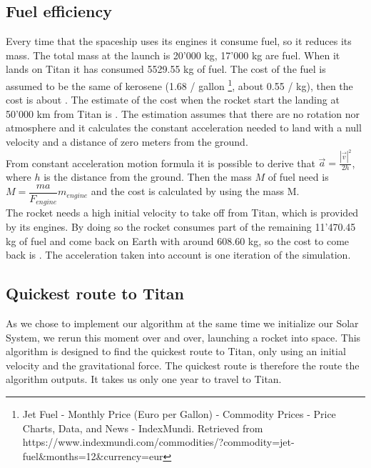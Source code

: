 \documentclass[10pt,a4paper]{article}
\begin{document}
	\subsection{Fuel efficiency}
	Every time that the spaceship uses its engines it consume fuel, so it reduces its mass. The total mass at the launch is 20'000 kg, 17'000 kg are fuel. When it lands on Titan it has consumed 5529.55 kg of fuel. The cost of the fuel is assumed to be the same of kerosene (1.68 \officialeuro / gallon \footnote{Jet Fuel - Monthly Price (Euro per Gallon) - Commodity Prices - Price Charts, Data, and News - IndexMundi. Retrieved from https://www.indexmundi.com/commodities/?commodity=jet-fuel\&months=12\&currency=eur}, about 0.55 \officialeuro / kg), then the cost is about . The estimate of the cost when the rocket start the landing at 50'000 km from Titan is . The estimation assumes that there are no rotation nor atmosphere and it calculates the constant acceleration needed to land with a null  velocity and a distance of zero meters from the ground. \\
	From constant acceleration motion formula it is possible to derive that $\vec{a} = \frac{|\vec{v}|^2}{2h}$, where $h$ is the distance from the ground. Then the mass $M$ of fuel need is $M = \dfrac{m a}{F_{engine}}m_{engine} $ and the cost is calculated by using the mass M.\\
	The rocket needs a high initial velocity to take off from Titan, which is provided by its engines. By doing so the rocket consumes part of the remaining 11'470.45 kg of fuel and come back on Earth with around 608.60 kg, so the cost to come back is . The acceleration taken into account is one iteration of the simulation.
	
	\subsection{Quickest route to Titan}
	As we chose to implement our algorithm at the same time we initialize our Solar System, we rerun this moment over and over, launching a rocket into space. This algorithm is designed to find the quickest route to Titan, only using an initial velocity and the gravitational force. The quickest route is therefore the route the algorithm outputs. It takes us only one year to travel to Titan.
	
	
\end{document}
